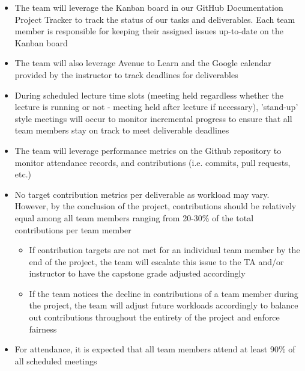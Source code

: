 \documentclass{article}
\begin{document}
\begin{itemize}
  \item The team will leverage the Kanban board in our GitHub Documentation Project 
  Tracker to track the status of our tasks and deliverables. Each team member is
  responsible for keeping their assigned issues up-to-date on the Kanban board
  \item The team will also leverage Avenue to Learn and the Google calendar 
  provided by the instructor to track deadlines for deliverables
  \item During scheduled lecture time slots (meeting held regardless whether the 
  lecture is running or not - meeting held after lecture if necessary), 'stand-up' 
  style meetings will occur to monitor incremental progress to ensure that all 
  team members stay on track to meet deliverable deadlines
  \item The team will leverage performance metrics on the Github repository to 
  monitor attendance records, and contributions (i.e. commits, pull requests, etc.)
  \item No target contribution metrics per deliverable as workload may vary. However, 
  by the conclusion of the project, contributions should be relatively equal among all team members 
  ranging from 20-30\% of the total contributions per team member
  \begin{itemize}
    \item If contribution targets are not met for an individual team member by the 
    end of the project, the team will escalate this issue to the TA and/or instructor 
    to have the capstone grade adjusted accordingly
    \item If the team notices the decline in contributions of a team member during the project, 
    the team will adjust future workloads accordingly to balance out contributions throughout the 
    entirety of the project and enforce fairness
  \end{itemize}
  \item For attendance, it is expected that all team members attend at least 90\% 
  of all scheduled meetings
\end{itemize}

\end{document}
